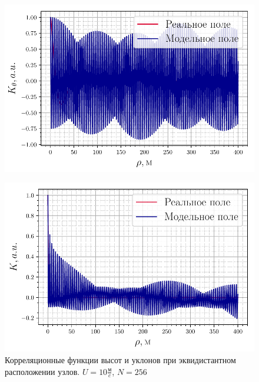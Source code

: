 \begin{figure}[h!]
	\begin{minipage}{0.49\linewidth}
			\centering
			\includegraphics[width=\linewidth]{fig/correlation_height_slopes0.pdf}
			\label{fig:ch0}		
	\end{minipage}
	\hfill
	\begin{minipage}{0.49\linewidth}
			\centering
			\includegraphics[width=\linewidth]{fig/correlation_angles_slopes0.pdf}
	\end{minipage}
	\caption{Корреляционные функции высот и уклонов при эквидистантном расположении узлов. $U=10 \frac{\text{м}}{c}$, $N=256$}
	\label{fig:ca0}		
\end{figure}

